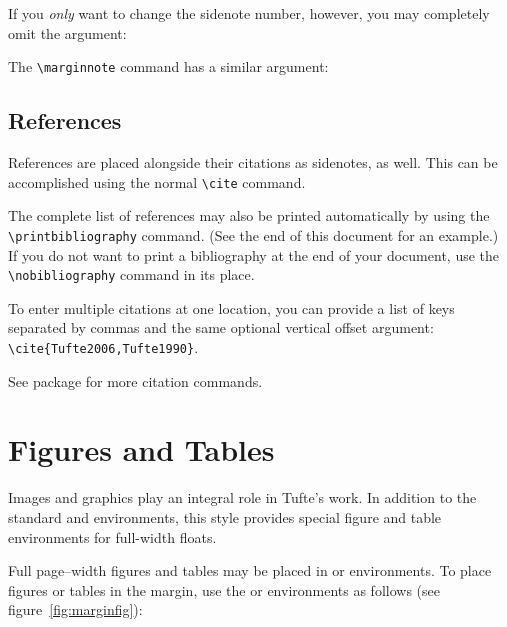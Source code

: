 If you \emph{only} want to change the sidenote number, however, you may
completely omit the  argument:
\begin{docspec}
\end{docspec}

The \Verb|\marginnote| command has a similar  argument:
\begin{docspec}
\end{docspec}

\subsection{References}
References are placed alongside their citations as sidenotes,
as well.  This can be accomplished using the normal \Verb|\cite|
command.

The complete list of references may also be printed automatically by using
the \Verb|\printbibliography| command.  (See the end of this document for an
example.)  If you do not want to print a bibliography at the end of your
document, use the \Verb|\nobibliography| command in its place.  

To enter multiple citations at one location,\cite{Tufte2006,Tufte1990} you can
provide a list of keys separated by commas and the same optional vertical
offset argument: \Verb|\cite{Tufte2006,Tufte1990}|.  
\begin{docspec}
\end{docspec}

See package  for more citation commands.

\section{Figures and Tables}\label{sec:figures-and-tables}
Images and graphics play an integral role in Tufte's work.
In addition to the standard  and  environments,
this style provides special figure and table environments for full-width
floats.

Full page--width figures and tables may be placed in  or
 environments.  To place figures or tables in the margin,
use the  or  environments as follows
(see figure~\ref{fig:marginfig}):

